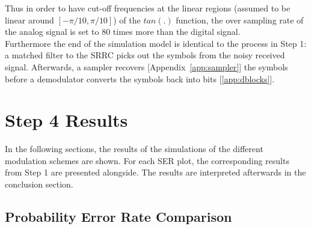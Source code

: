\documentclass[]{article}
\begin{document}
Thus in order to have cut-off frequencies at the linear regions (assumed to be linear around $\left[ -\pi/10,\pi/10 \right] $) of the $tan(.)$ function, the over sampling rate of the analog signal is set to 80 times more than the digital signal. \\



Furthermore the end of the simulation model is identical to the process in Step 1: a matched filter to the SRRC picks out the symbols from the noisy received signal.  Afterwards, a sampler recovers [Appendix~\ref{app:sampler}] the symbols before a demodulator converts the symbols back into bits [\ref{app:dblocks}].  


\section{Step 4 Results}
\label{sec:results}
In the following sections, the results of the simulations of the different modulation schemes are shown.  For each SER plot, the corresponding results from Step 1 are presented alongside.  The results are interpreted afterwards in the conclusion section.

\newpage
\subsection{Probability Error Rate Comparison}
\end{document}
